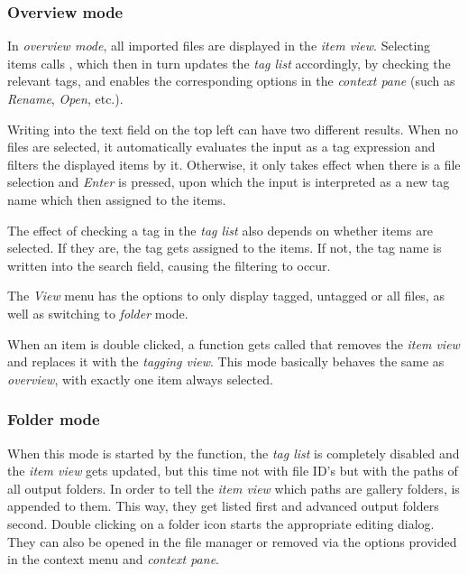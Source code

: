 \subsubsection{Overview mode}

In \emph{overview mode}, all imported files are displayed in the \emph{item view}. Selecting items calls , which then in turn updates the \emph{tag list} accordingly, by checking the relevant tags, and enables the corresponding options in the \emph{context pane} (such as \emph{Rename}, \emph{Open}, etc.). 

Writing into the text field on the top left can have two different results. When no files are selected, it automatically evaluates the input as a tag expression and filters the displayed items by it. Otherwise, it only takes effect when there is a file selection and \emph{Enter} is pressed, upon which the input is interpreted as  a new tag name which then assigned to the items. 

The effect of checking a tag in the \emph{tag list} also depends on whether items are selected. If they are, the tag gets assigned to the items. If not, the tag name is written into the search field, causing the filtering to occur.

The \emph{View} menu has the options to only display tagged, untagged or all files, as well as switching to \emph{folder} mode.

When an item is double clicked, a function gets called that removes the \emph{item view} and replaces it with the \emph{tagging view}. This mode basically behaves the same as \emph{overview}, with exactly one item always selected.

\subsubsection{Folder mode}
When this mode is started by the  function, the \emph{tag list} is completely disabled and the \emph{item view} gets updated, but this time not with file ID's but with the paths of all output folders. In order to tell the \emph{item view} which paths are gallery folders,  is appended to them. This way, they get listed first and advanced output folders second. Double clicking on a folder icon starts the appropriate editing dialog. They can also be opened in the file manager or removed via the options provided in the context menu and \emph{context pane}.

